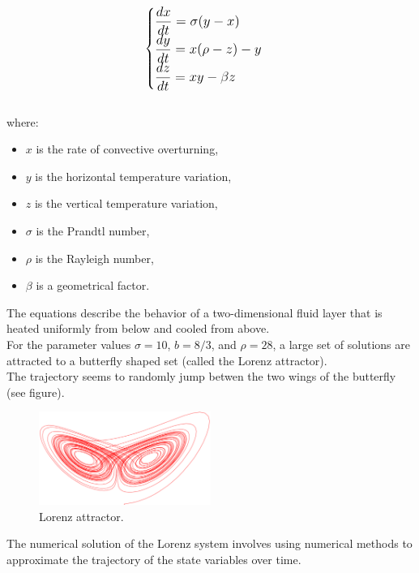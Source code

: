 \documentclass[a4paper,12pt,french]{article}
\begin{document}
\begin{equation}
\large
\begin{cases}
    \displaystyle\frac{dx}{dt} = \sigma(y - x) \\
    \displaystyle\frac{dy}{dt} = x(\rho - z) - y \\
    \displaystyle\frac{dz}{dt} = xy - \beta z
\end{cases}
\normalsize
\end{equation}\\
   
where:
\begin{itemize}
    \item $x$ is the rate of convective overturning,
    \item $y$ is the horizontal temperature variation,
    \item $z$ is the vertical temperature variation,
    \item $\sigma$ is the Prandtl number,
    \item $\rho$ is the Rayleigh number,
    \item $\beta$ is a geometrical factor.
\end{itemize}

The equations describe the behavior of a two-dimensional fluid layer that is heated uniformly from below and cooled from above.\\
   
For the parameter values $\sigma = 10$, $b = 8/3$, and $\rho = 28$, a large set of solutions are attracted to a butterfly shaped set (called the Lorenz attractor). \\

The trajectory seems to randomly jump betwen the two wings of the butterfly (see figure). 
   
\begin{figure}[ht!]
    \centering
    \includegraphics[width=0.5\textwidth]{img/lorenz-attractor-112761.png}
    \caption{Lorenz attractor.}
    \label{fig:1}
\end{figure}

The numerical solution of the Lorenz system involves using numerical methods to approximate the trajectory of the state variables over time. 
\end{document}
